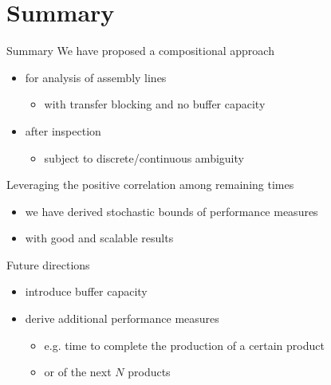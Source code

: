 
\section*{Summary}

  \begin{frame}{Summary}
    We have proposed a compositional approach
    \begin{itemize}
      \item for analysis of assembly lines
      \begin{itemize}
        \item with transfer blocking and no buffer capacity
      \end{itemize}
      \item after inspection
      \begin{itemize}
        \item subject to discrete/continuous ambiguity
      \end{itemize}
    \end{itemize}
    
    \vspace{1em}
    Leveraging the positive correlation among remaining times
    \begin{itemize}
      \item we have derived stochastic bounds of performance measures
      \item with good and scalable results
    \end{itemize}
    
    \vspace{1em}
    Future directions
    \begin{itemize}
      \item introduce buffer capacity
      \item derive additional performance measures
      \begin{itemize}
        \item e.g. time to complete the production of a certain product
        \item or of the next $N$ products
      \end{itemize}
    \end{itemize}
  \end{frame}